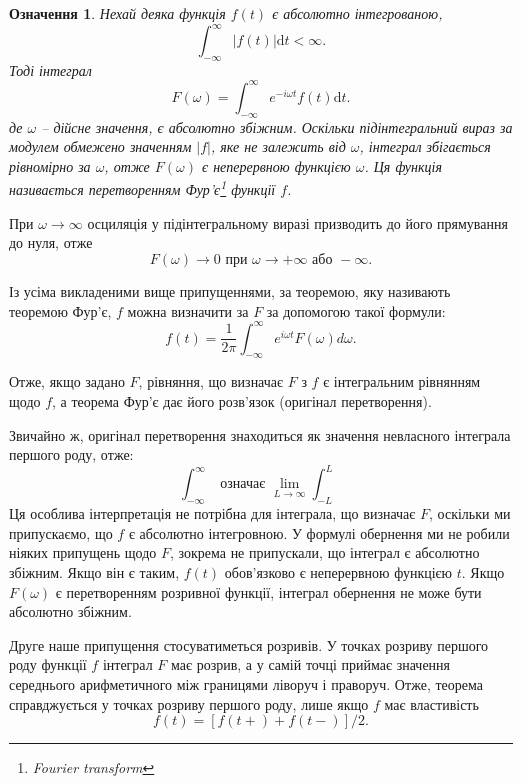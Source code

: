 \documentclass[14pt,twoside]{extreport}
\theoremstyle{mystyle}
\newtheorem{dfn}{Означення}
\numberwithin{equation}{chapter}
\begin{document}
\begin{dfn}
Нехай деяка функція $f(t)$ є абсолютно інтегрованою,
\begin{equation}
	\displaystyle \int_{-\infty}^{\infty}|f(t)|\mathrm{d}t<\infty.
\end{equation}
Тоді інтеграл
\begin{equation}
	\displaystyle F(\omega)=\int_{-\infty}^{\infty}e^{-i\omega t}f(t)\mathrm{d}t.
\end{equation}
де $\omega$ -- дійсне значення, є абсолютно збіжним. Оскільки підінтегральний вираз за модулем обмежено значенням $|f|$, яке не залежить від $\omega$, інтеграл збігається рівномірно за $\omega$, отже $F(\omega)$ є неперервною функцією $\omega$. Ця функція називається \emph{перетворенням Фур'є\footnote{Fourier transform}} функції $f$.
\end{dfn}

При $\omega\to \infty$ осциляція у підінтегральному виразі призводить до його прямування до нуля, отже
\begin{equation}
	F(\omega)\to  0 \textrm{ при } \omega\to +\infty \textrm{ або }-\infty.
\end{equation}

Із усіма викладеними вище припущеннями, за теоремою, яку називають теоремою Фур'є, $f$ можна визначити за $F$ за допомогою такої формули:
\begin{equation}
	 f(t)=\dfrac{1}{2\pi}\int_{-\infty}^{\infty}e^{i\omega t}F(\omega)d\omega.
\end{equation}

Отже, якщо задано $F$, рівняння, що визначає $F$ з $f$ є інтегральним рівнянням щодо $f$, а теорема Фур'є дає його розв'язок (оригінал перетворення).

Звичайно ж, оригінал перетворення знаходиться як значення невласного інтеграла першого роду, отже:
\begin{equation*}
	\displaystyle \int_{-\infty}^{\infty} \textrm{ означає }\displaystyle \lim_{L\to \infty}\int_{-L}^{L}
\end{equation*}
Ця особлива інтерпретація не потрібна для інтеграла, що визначає $F$, оскільки ми припускаємо, що $f$ є абсолютно інтегровною. У формулі обернення ми не робили ніяких припущень щодо $F$, зокрема не припускали, що інтеграл є абсолютно збіжним. Якщо він є таким, $f(t)$ обов'язково є неперервною функцією $t$. Якщо $F(\omega)$ є перетворенням розривної функції, інтеграл обернення не може бути абсолютно збіжним.

Друге наше припущення стосуватиметься розривів. У точках розриву першого роду функції $f$ інтеграл $F$ має розрив, а у самій точці приймає значення середнього арифметичного між границями ліворуч і праворуч. Отже, теорема справджується у точках розриву першого роду, лише якщо $f$ має властивість
\begin{equation*}
	f(t)=[f(t+)+f(t-)]/2.
\end{equation*}
\end{document}
